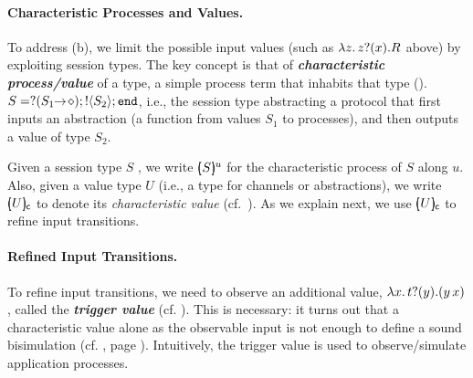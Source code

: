 \paragraph{Characteristic Processes and Values.}
To address (b), we limit the possible 
input values (such as $\lambda z.\,z ? (x) . R$ above) %
by exploiting session types.
The key concept is that of {\bf \emph{characteristic process/value}}
of a type,  
a simple process term that inhabits that type ().
$S = ? (S_1\!\! \rightarrow\! \diamond) ; ! \langle S_2 \rangle ; \mathtt{end}$, i.e.,  the session type abstracting a protocol that 
 first
inputs an abstraction (a function from values $S_1$ to processes), 
and then outputs a value of type $S_2$.


Given a session type $S$ , we write $[\!\!(S)\!\!]^{u} $
for the characteristic process of $S$ along   $u$.
Also, %
given a value type $U$ (i.e., a type for channels or abstractions), we write 
$[\!\!(U)\!\!]_{\mathsf{c}}$ to denote its \emph{characteristic value} (cf.~).
As we explain next, we use 
$[\!\!(U)\!\!]_{\mathsf{c}}$
 to refine input transitions.

\paragraph{Refined Input Transitions.}
To refine  input transitions, we need to observe 
an additional value, 
$\lambda {x}.\,t ? (y) . (y\, {{x}})$, 
called the {\bf\em trigger value} (cf. ). 
This is necessary: it turns out
that a characteristic value 
alone as the observable input 
is not enough to define a sound bisimulation (cf. , page \pageref{ex:motivation}).
Intuitively, the trigger value is used
to observe/simulate application processes.


